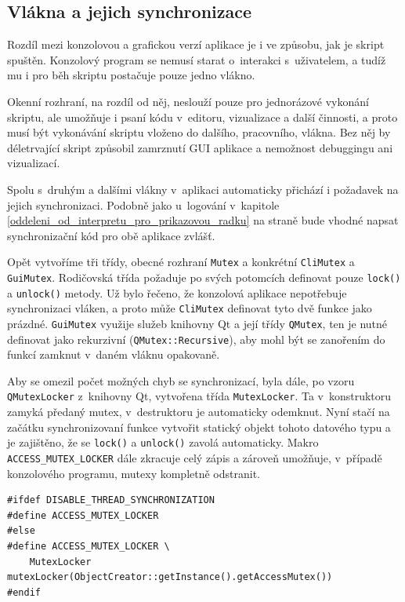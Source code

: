 \documentclass[11pt,twoside,a4paper]{book}
\begin{document}
\subsection{Vlákna a jejich synchronizace}

Rozdíl mezi konzolovou a grafickou verzí aplikace je i ve způsobu, jak je skript spuštěn. Konzolový program se nemusí starat o~interakci s~uživatelem, a tudíž mu i pro běh skriptu postačuje pouze jedno vlákno.

Okenní rozhraní, na rozdíl od něj, neslouží pouze pro jednorázové vykonání skriptu, ale umožňuje i psaní kódu v~editoru, vizualizace a další činnosti, a proto musí být vykonávání skriptu vloženo do dalšího, pracovního, vlákna. Bez něj by déletrvající skript způsobil zamrznutí GUI aplikace a nemožnost debuggingu ani vizualizací.

Spolu s~druhým a dalšími vlákny v~aplikaci automaticky přichází i požadavek na jejich synchronizaci. Podobně jako u~logování v~kapitole \ref{oddeleni_od_interpretu_pro_prikazovou_radku} na straně \pageref{oddeleni_od_interpretu_pro_prikazovou_radku} bude vhodné napsat synchronizační kód pro obě aplikace zvlášť.

Opět vytvoříme tři třídy, obecné rozhraní \texttt{Mutex} a konkrétní \texttt{CliMutex} a \texttt{GuiMutex}. Ro\-di\-čov\-ská třída požaduje po svých potomcích definovat pouze \texttt{lock()} a \texttt{unlock()} metody. Už bylo řečeno, že konzolová aplikace nepotřebuje synchronizaci vláken, a proto může \texttt{CliMutex} definovat tyto dvě funkce jako prázdné. \texttt{GuiMutex} využije služeb knihovny Qt a její třídy \texttt{QMutex}, ten je nutné definovat jako rekurzivní (\texttt{QMutex::Recursive}), aby mohl být se zanořením do funkcí zamknut v~daném vláknu opakovaně.

Aby se omezil počet možných chyb se synchronizací, byla dále, po vzoru \texttt{QMu\-tex\-Loc\-ker} z~knihovny Qt, vytvořena třída \texttt{MutexLocker}. Ta v~konstruktoru zamyká předaný mutex, v~destruktoru je automaticky odemknut. Nyní stačí na začátku synchronizovaní funkce vytvořit statický objekt tohoto datového typu a je zajištěno, že se \texttt{lock()} a \texttt{unlock()} zavolá automaticky. Makro \texttt{ACCESS\_MUTEX\_LOCKER} dále zkracuje celý zápis a zároveň umožňuje, v~případě konzolového programu, mutexy kompletně odstranit.

\begin{verbatim}
#ifdef DISABLE_THREAD_SYNCHRONIZATION
#define ACCESS_MUTEX_LOCKER
#else
#define ACCESS_MUTEX_LOCKER \
    MutexLocker mutexLocker(ObjectCreator::getInstance().getAccessMutex())
#endif
\end{verbatim}
\end{document}
